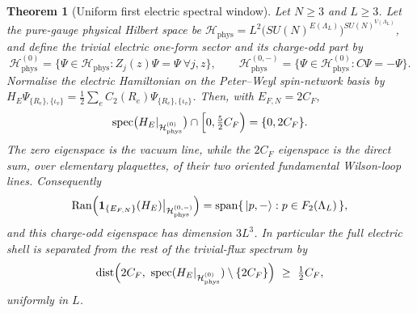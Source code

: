 \documentclass[11pt]{article}
\theoremstyle{plain}
\newtheorem{theorem}{Theorem}
\theoremstyle{definition}
\theoremstyle{remark}
\newcommand{\CF}{C_F}
\begin{document}
\begin{theorem}[Uniform first electric spectral window]\label{thm:window}
Let $N\ge3$ and $L\ge3$. Let the pure-gauge physical Hilbert space be
$\mathcal H_{\mathrm{phys}}
 =L^2\bigl(SU(N)^{E(\Lambda_L)}\bigr)^{SU(N)^{V(\Lambda_L)}}$,
and define the trivial electric one-form sector and its charge-odd part by
\[
  \mathcal H^{(0)}_{\mathrm{phys}}
   =\{\Psi\in\mathcal H_{\mathrm{phys}}:Z_j(z)\Psi=\Psi\ \forall j,z\},
  \qquad
  \mathcal H^{(0,-)}_{\mathrm{phys}}
   =\{\Psi\in\mathcal H^{(0)}_{\mathrm{phys}}:C\Psi=-\Psi\}.
\]
Normalise the electric Hamiltonian on the Peter--Weyl spin-network basis by
$H_E\Psi_{\{R_e\},\{\iota_v\}}
  =\tfrac12\sum_e C_2(R_e)\Psi_{\{R_e\},\{\iota_v\}}$.
Then, with $E_{F,N}=2\CF$,
\begin{equation}\label{eq:window}
  \operatorname{spec}\bigl(H_E|_{\mathcal H^{(0)}_{\mathrm{phys}}}\bigr)
  \cap\Bigl[0,\tfrac52\CF\Bigr)=\{0,2\CF\}.
\end{equation}
The zero eigenspace is the vacuum line, while the $2\CF$ eigenspace is the
direct sum, over elementary plaquettes, of their two oriented fundamental
Wilson-loop lines. Consequently
\begin{equation}\label{eq:shellrange}
  \operatorname{Ran}\Bigl(\mathbf 1_{\{E_{F,N}\}}(H_E)
    \big|_{\mathcal H^{(0,-)}_{\mathrm{phys}}}\Bigr)
  =\operatorname{span}\{\,|p,-\rangle : p\in F_2(\Lambda_L)\,\},
\end{equation}
and this charge-odd eigenspace has dimension $3L^3$. In particular the full
electric shell is separated from the rest of the trivial-flux spectrum by
\begin{equation}\label{eq:margin}
  \operatorname{dist}\Bigl(2\CF,\ \operatorname{spec}
    (H_E|_{\mathcal H^{(0)}_{\mathrm{phys}}})\setminus\{2\CF\}\Bigr)
  \ \ge\ \tfrac12\CF ,
\end{equation}
uniformly in $L$.
\end{theorem}
\end{document}
